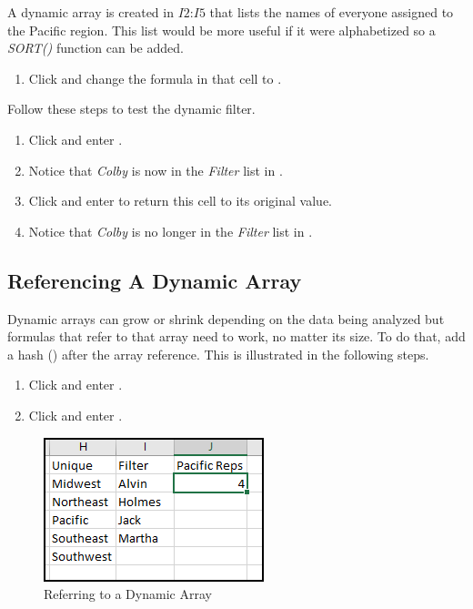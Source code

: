 A dynamic array is created in $ I2 $:$ I5 $ that lists the names of everyone assigned to the Pacific region. This list would be more useful if it were alphabetized so a \textit{SORT()} function can be added. 

\begin{enumbox}
	\begin{enumerate}
		\item Click  and change the formula in that cell to . 
	\end{enumerate}
\end{enumbox}

Follow these steps to test the dynamic filter.

\begin{enumbox}
	\begin{enumerate}
		\item Click  and enter .
		\item Notice that \textit{Colby} is now in the \textit{Filter} list in .
		\item Click  and enter  to return this cell to its original value.
		\item Notice that \textit{Colby} is no longer in the \textit{Filter} list in .
	\end{enumerate}
\end{enumbox}

\subsection{Referencing A Dynamic Array}

Dynamic arrays can grow or shrink depending on the data being analyzed but formulas that refer to that array need to work, no matter its size. To do that, add a hash (\fmtKeystroke{\#}) after the array reference. This is illustrated in the following steps.

\begin{enumbox}
	\begin{enumerate}
		\item Click  and enter .
		\item Click  and enter .
	\end{enumerate}
\end{enumbox}

\begin{figure}[H]
	\centering
	\includegraphics[width=\maxwidth{.50\linewidth}]{gfx/apb_fig04}
	\caption{Referring to a Dynamic Array}
	\label{apb:fig04}
\end{figure}

